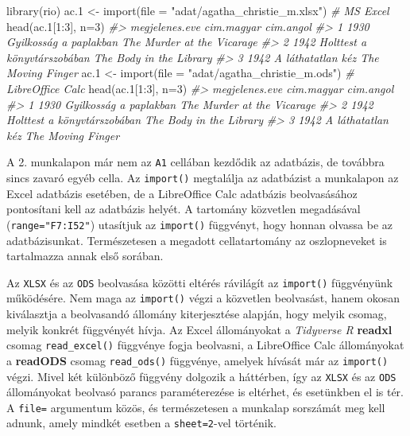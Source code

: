 \documentclass[
]{book}
\newenvironment{Shaded}{\begin{snugshade}}{\end{snugshade}}
\newcommand{\AttributeTok}[1]{\textcolor[rgb]{0.77,0.63,0.00}{#1}}
\newcommand{\CommentTok}[1]{\textcolor[rgb]{0.56,0.35,0.01}{\textit{#1}}}
\newcommand{\DecValTok}[1]{\textcolor[rgb]{0.00,0.00,0.81}{#1}}
\newcommand{\FloatTok}[1]{\textcolor[rgb]{0.00,0.00,0.81}{#1}}
\newcommand{\FunctionTok}[1]{\textcolor[rgb]{0.00,0.00,0.00}{#1}}
\newcommand{\NormalTok}[1]{#1}
\newcommand{\OtherTok}[1]{\textcolor[rgb]{0.56,0.35,0.01}{#1}}
\newcommand{\SpecialCharTok}[1]{\textcolor[rgb]{0.00,0.00,0.00}{#1}}
\newcommand{\StringTok}[1]{\textcolor[rgb]{0.31,0.60,0.02}{#1}}
\begin{document}
\begin{Shaded}
\begin{Highlighting}[]
\FunctionTok{library}\NormalTok{(rio)}
\NormalTok{ac}\FloatTok{.1} \OtherTok{\textless{}{-}} \FunctionTok{import}\NormalTok{(}\AttributeTok{file =} \StringTok{"adat/agatha\_christie\_m.xlsx"}\NormalTok{) }\CommentTok{\# MS Excel}
\FunctionTok{head}\NormalTok{(ac}\FloatTok{.1}\NormalTok{[}\DecValTok{1}\SpecialCharTok{:}\DecValTok{3}\NormalTok{], }\AttributeTok{n=}\DecValTok{3}\NormalTok{)}
\CommentTok{\#\textgreater{}   megjelenes.eve                  cim.magyar                  cim.angol}
\CommentTok{\#\textgreater{} 1           1930      Gyilkosság a paplakban The Murder at the Vicarage}
\CommentTok{\#\textgreater{} 2           1942 Holttest a könyvtárszobában    The Body in the Library}
\CommentTok{\#\textgreater{} 3           1942           A láthatatlan kéz          The Moving Finger}
\NormalTok{ac}\FloatTok{.1} \OtherTok{\textless{}{-}} \FunctionTok{import}\NormalTok{(}\AttributeTok{file =} \StringTok{"adat/agatha\_christie\_m.ods"}\NormalTok{)  }\CommentTok{\# LibreOffice Calc}
\FunctionTok{head}\NormalTok{(ac}\FloatTok{.1}\NormalTok{[}\DecValTok{1}\SpecialCharTok{:}\DecValTok{3}\NormalTok{], }\AttributeTok{n=}\DecValTok{3}\NormalTok{)}
\CommentTok{\#\textgreater{}   megjelenes.eve                  cim.magyar                  cim.angol}
\CommentTok{\#\textgreater{} 1           1930      Gyilkosság a paplakban The Murder at the Vicarage}
\CommentTok{\#\textgreater{} 2           1942 Holttest a könyvtárszobában    The Body in the Library}
\CommentTok{\#\textgreater{} 3           1942           A láthatatlan kéz          The Moving Finger}
\end{Highlighting}
\end{Shaded}

A 2. munkalapon már nem az \texttt{A1} cellában kezdődik az adatbázis, de továbbra sincs zavaró egyéb cella. Az \texttt{import()} megtalálja az adatbázist a munkalapon az Excel adatbázis esetében, de a LibreOffice Calc adatbázis beolvasásához pontosítani kell az adatbázis helyét. A tartomány közvetlen megadásával (\texttt{range="F7:I52"}) utasítjuk az \texttt{import()} függvényt, hogy honnan olvassa be az adatbázisunkat. Természetesen a megadott cellatartomány az oszlopneveket is tartalmazza annak első sorában.

Az \texttt{XLSX} és az \texttt{ODS} beolvasása közötti eltérés rávilágít az \texttt{import()} függvényünk működésére. Nem maga az \texttt{import()} végzi a közvetlen beolvasást, hanem okosan kiválasztja a beolvasandó állomány kiterjesztése alapján, hogy melyik csomag, melyik konkrét függvényét hívja. Az Excel állományokat a \emph{Tidyverse R} \textbf{readxl} csomag \texttt{read\_excel()} függvénye fogja beolvasni, a LibreOffice Calc állományokat a \textbf{readODS} csomag \texttt{read\_ods()} függvénye, amelyek hívását már az \texttt{import()} végzi. Mivel két különböző függvény dolgozik a háttérben, így az \texttt{XLSX} és az \texttt{ODS} állományokat beolvasó parancs paraméterezése is eltérhet, és esetünkben el is tér. A \texttt{file=} argumentum közös, és természetesen a munkalap sorszámát meg kell adnunk, amely mindkét esetben a \texttt{sheet=2}-vel történik.
\end{document}
